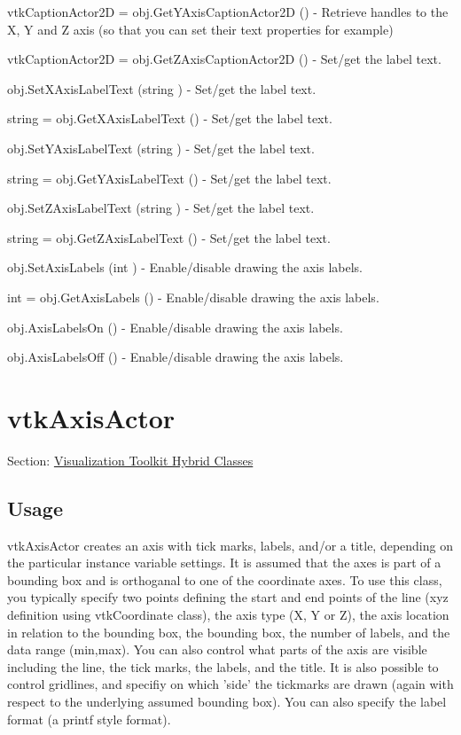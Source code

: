 \begin{DoxyItemize}
\item {\ttfamily vtk\-Caption\-Actor2\-D = obj.\-Get\-Y\-Axis\-Caption\-Actor2\-D ()} -\/ Retrieve handles to the X, Y and Z axis (so that you can set their text properties for example)  
\item {\ttfamily vtk\-Caption\-Actor2\-D = obj.\-Get\-Z\-Axis\-Caption\-Actor2\-D ()} -\/ Set/get the label text.  
\item {\ttfamily obj.\-Set\-X\-Axis\-Label\-Text (string )} -\/ Set/get the label text.  
\item {\ttfamily string = obj.\-Get\-X\-Axis\-Label\-Text ()} -\/ Set/get the label text.  
\item {\ttfamily obj.\-Set\-Y\-Axis\-Label\-Text (string )} -\/ Set/get the label text.  
\item {\ttfamily string = obj.\-Get\-Y\-Axis\-Label\-Text ()} -\/ Set/get the label text.  
\item {\ttfamily obj.\-Set\-Z\-Axis\-Label\-Text (string )} -\/ Set/get the label text.  
\item {\ttfamily string = obj.\-Get\-Z\-Axis\-Label\-Text ()} -\/ Set/get the label text.  
\item {\ttfamily obj.\-Set\-Axis\-Labels (int )} -\/ Enable/disable drawing the axis labels.  
\item {\ttfamily int = obj.\-Get\-Axis\-Labels ()} -\/ Enable/disable drawing the axis labels.  
\item {\ttfamily obj.\-Axis\-Labels\-On ()} -\/ Enable/disable drawing the axis labels.  
\item {\ttfamily obj.\-Axis\-Labels\-Off ()} -\/ Enable/disable drawing the axis labels.  
\end{DoxyItemize}\hypertarget{vtkhybrid_vtkaxisactor}{}\section{vtk\-Axis\-Actor}\label{vtkhybrid_vtkaxisactor}
Section\-: \hyperlink{sec_vtkhybrid}{Visualization Toolkit Hybrid Classes} \hypertarget{vtkwidgets_vtkxyplotwidget_Usage}{}\subsection{Usage}\label{vtkwidgets_vtkxyplotwidget_Usage}
vtk\-Axis\-Actor creates an axis with tick marks, labels, and/or a title, depending on the particular instance variable settings. It is assumed that the axes is part of a bounding box and is orthoganal to one of the coordinate axes. To use this class, you typically specify two points defining the start and end points of the line (xyz definition using vtk\-Coordinate class), the axis type (X, Y or Z), the axis location in relation to the bounding box, the bounding box, the number of labels, and the data range (min,max). You can also control what parts of the axis are visible including the line, the tick marks, the labels, and the title. It is also possible to control gridlines, and specifiy on which 'side' the tickmarks are drawn (again with respect to the underlying assumed bounding box). You can also specify the label format (a printf style format).

